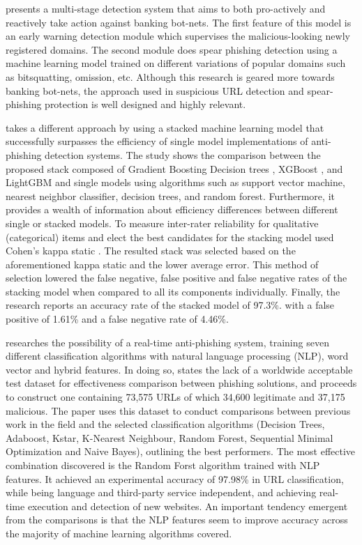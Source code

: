 \cite{MULTISTAGED_DETECTION_BOTNETS} presents a multi-stage detection system
that aims to both pro-actively and reactively take action against banking
bot-nets. The first feature of this model is an early warning detection module
which supervises the malicious-looking newly registered domains. The second
module does spear phishing detection using a machine learning model trained on
different variations of popular domains such as bitsquatting, omission, etc.
Although this research is geared more towards banking bot-nets, the approach
used in suspicious URL detection and spear-phishing protection is well designed
and highly relevant.

\cite{STACKED_ML_URL_HTML} takes a different approach by using a stacked machine
learning model that successfully surpasses the efficiency of single model
implementations of anti-phishing detection systems. The study shows the
comparison between the proposed stack composed of Gradient Boosting Decision
trees \citep{GBDT}, XGBoost \citep{XGBOOST}, and LightGBM \citep{LIGHTGBM} and
single models using algorithms such as support vector machine, nearest neighbor
classifier, decision trees, and random forest. Furthermore, it provides a wealth
of information about efficiency differences between different single or stacked
models. To measure inter-rater reliability for qualitative (categorical) items
and elect the best candidates for the stacking model \cite{STACKED_ML_URL_HTML}
used Cohen's kappa static \citep{DATA_MINING_T&T}. The resulted stack was
selected based on the aforementioned kappa static and the lower average error.
This method of selection lowered the false negative, false positive and false
negative rates of the stacking model when compared to all its components
individually. Finally, the research reports an accuracy rate of the stacked
model of 97.3\%. with a false positive of 1.61\% and a false negative rate of
4.46\%.

\cite{ML_BASED_DETECTION_FROM_URL} researches the possibility of a real-time
anti-phishing system, training seven different classification algorithms with
natural language processing (NLP), word vector and hybrid features. In doing so,
\cite{ML_BASED_DETECTION_FROM_URL} states the lack of a worldwide acceptable
test dataset for effectiveness comparison between phishing solutions, and
proceeds to construct one containing 73,575 URLs of which 34,600 legitimate and
37,175 malicious. The paper uses this dataset to conduct comparisons between
previous work in the field and the selected classification algorithms (Decision
Trees, Adaboost, Kstar, K-Nearest Neighbour, Random Forest, Sequential Minimal
Optimization and Naive Bayes), outlining the best performers. The most effective
combination discovered is the Random Forst algorithm trained with NLP features.
It achieved an experimental accuracy of 97.98\% in URL classification, while
being language and third-party service independent, and achieving real-time
execution and detection of new websites. An important tendency emergent from the
comparisons is that the NLP features seem to improve accuracy across the
majority of machine learning algorithms covered.

